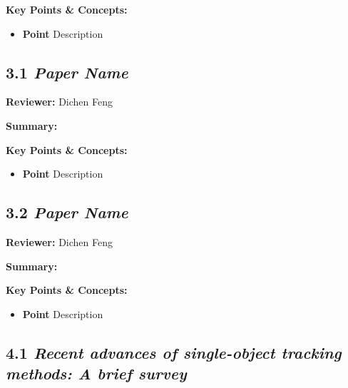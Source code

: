 \documentclass{article}
\begin{document}
\vspace{0.3cm}

\textbf{Key Points \& Concepts:}
\begin{itemize}
  \item \textbf{Point} Description
\end{itemize}

\subsection*{3.1 \textit{Paper Name}}

\hspace*{\parindent}\textbf{Reviewer:} Dichen Feng

\vspace{0.3cm}

\textbf{Summary:}

\vspace{0.3cm}

\textbf{Key Points \& Concepts:}
\begin{itemize}
  \item \textbf{Point} Description
\end{itemize}

\subsection*{3.2 \textit{Paper Name}}

\hspace*{\parindent}\textbf{Reviewer:} Dichen Feng

\vspace{0.3cm}

\textbf{Summary:}

\vspace{0.3cm}

\textbf{Key Points \& Concepts:}
\begin{itemize}
  \item \textbf{Point} Description
\end{itemize}

\subsection*{4.1 \textit{Recent advances of single-object tracking methods: A brief survey}}
\end{document}
